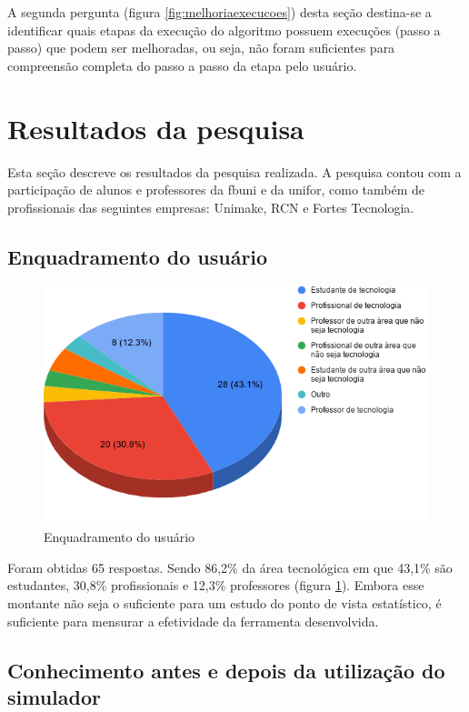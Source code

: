 A segunda pergunta (figura \ref{fig:melhoriaexecucoes}) desta seção destina-se a identificar quais etapas da execução do algoritmo possuem execuções (passo a passo) que podem ser melhoradas, ou seja, não foram suficientes para compreensão completa do passo a passo da etapa pelo usuário.

\section{Resultados da pesquisa}

Esta seção descreve os resultados da pesquisa realizada. A pesquisa contou com a participação de alunos e professores da \acrshort{fbuni} e da \acrshort{unifor}, como também de profissionais das seguintes empresas: Unimake, RCN e Fortes Tecnologia.

\subsection{Enquadramento do usuário}

\begin{figure}[H]
    \centering
    \caption{Enquadramento do usuário}
    \label{fig:enquadramentousuarioresp}
    \includegraphics[width=.65\linewidth]{Questionario/CQ1.png}
\end{figure}

Foram obtidas 65 respostas. Sendo 86,2\% da área tecnológica em que 43,1\% são estudantes, 30,8\% profissionais e 12,3\% professores (figura \ref{fig:enquadramentousuarioresp}). Embora esse montante não seja o suficiente para um estudo do ponto de vista estatístico, é suficiente para mensurar a efetividade da ferramenta desenvolvida.

\subsection{Conhecimento antes e depois da utilização do simulador}

